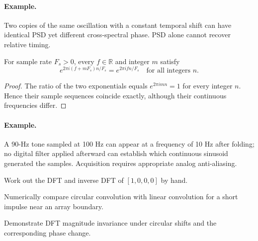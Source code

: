\paragraph{Example.} Two copies of the same oscillation with a constant temporal shift can have identical PSD yet different cross-spectral phase. PSD alone cannot recover relative timing.

\begin{proposition}For sample rate $F_s>0$, every $f\in\mathbb R$ and integer $m$ satisfy
\[e^{2\pi i (f+mF_s)n/F_s}=e^{2\pi i fn/F_s}\quad\text{for all integers }n.\]\end{proposition}
\begin{proof}The ratio of the two exponentials equals $e^{2\pi i mn}=1$ for every integer $n$. Hence their sample sequences coincide exactly, although their continuous frequencies differ.\end{proof}
\paragraph{Example.} A 90-Hz tone sampled at 100 Hz can appear at a frequency of 10 Hz after folding; no digital filter applied afterward can establish which continuous sinusoid generated the samples. Acquisition requires appropriate analog anti-aliasing.

\begin{exercises}
\item Work out the DFT and inverse DFT of $[1,0,0,0]$ by hand.
\item Numerically compare circular convolution with linear convolution for a short impulse near an array boundary.
\item Demonstrate DFT magnitude invariance under circular shifts and the corresponding phase change.
\end{exercises}
